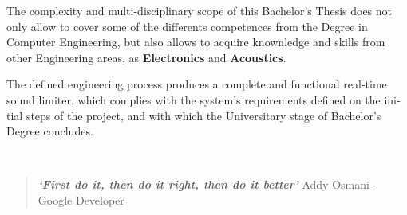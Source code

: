 \begin{otherlanguage}{english}
\begin{singlespace}
    \noindent The complexity and multi-disciplinary scope of this Bachelor's Thesis does not only allow to cover some of the differents competences from the Degree in Computer Engineering, but also allows to acquire knownledge and skills from other Engineering areas, as \textbf{Electronics} and \textbf{Acoustics}.

    \noindent The defined engineering process produces a complete and functional real-time sound limiter, which complies with the system's requirements defined on the initial steps of the project, and with which the Universitary stage of Bachelor's Degree concludes.

\end{singlespace}

\newpage
\thispagestyle{empty}

\end{otherlanguage}

~

\clearpage
{}
\thispagestyle{empty}

\vspace*{8cm}

\begin{quotation}
\noindent \begin{flushright}
\textbf {
    \emph {
        \large \lq First do it, then do it right, then do it better\rq
    }
}
\newline \large Addy Osmani - Google Developer

\par\end{flushright}{\large \par}
\end{quotation}
\newpage
\thispagestyle{empty}
